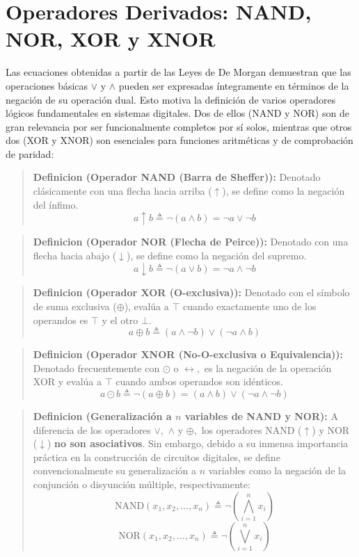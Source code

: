 \chapter{Operadores Derivados: NAND, NOR, XOR y XNOR}
Las ecuaciones obtenidas a partir de las Leyes de De Morgan demuestran que las operaciones básicas $\vee$ y $\wedge$ pueden ser expresadas íntegramente en términos de la negación de su operación dual. Esto motiva la definición de varios operadores lógicos fundamentales en sistemas digitales. Dos de ellos (NAND y NOR) son de gran relevancia por ser funcionalmente completos por sí solos, mientras que otros dos (XOR y XNOR) son esenciales para funciones aritméticas y de comprobación de paridad:

\begin{quote}\textbf{Definicion (Operador NAND (Barra de Sheffer)):}\label{nand}
Denotado clásicamente con una flecha hacia arriba ($\uparrow$), se define como la negación del ínfimo.
\[ a \uparrow b \triangleq \neg (a \wedge b) = \neg a \vee \neg b \]
\end{quote}

\begin{quote}\textbf{Definicion (Operador NOR (Flecha de Peirce)):}\label{nor}
Denotado con una flecha hacia abajo ($\downarrow$), se define como la negación del supremo.
\[ a \downarrow b \triangleq \neg (a \vee b) = \neg a \wedge \neg b \]
\end{quote}

\begin{quote}\textbf{Definicion (Operador XOR (O-exclusiva)):}\label{xor}
Denotado con el símbolo de suma exclusiva ($\oplus$), evalúa a $\top$ cuando exactamente uno de los operandos es $\top$ y el otro $\bot.$
\[ a \oplus b \triangleq (a \wedge \neg b) \vee (\neg a \wedge b) \]
\end{quote}

\begin{quote}\textbf{Definicion (Operador XNOR (No-O-exclusiva o Equivalencia)):}\label{xnor}
Denotado frecuentemente con $\odot$ o $\leftrightarrow,$ es la negación de la operación XOR y evalúa a $\top$ cuando ambos operandos son idénticos.
\[ a \odot b \triangleq \neg (a \oplus b) = (a \wedge b) \vee (\neg a \wedge \neg b) \]
\end{quote}

\begin{quote}\textbf{Definicion (Generalización a $n$ variables de NAND y NOR):}\label{gen_nand_nor}
A diferencia de los operadores $\vee,$ $\wedge$ y $\oplus,$ los operadores NAND ($\uparrow$) y NOR ($\downarrow$) \textbf{no son asociativos}. Sin embargo, debido a su inmensa importancia práctica en la construcción de circuitos digitales, se define convencionalmente su generalización a $n$ variables como la negación de la conjunción o disyunción múltiple, respectivamente:
\[ \text{NAND}(x_1, x_2, \dots, x_n) \triangleq \neg \left( \bigwedge_{i=1}^n x_i \right) \]
\[ \text{NOR}(x_1, x_2, \dots, x_n) \triangleq \neg \left( \bigvee_{i=1}^n x_i \right) \]
\end{quote}

